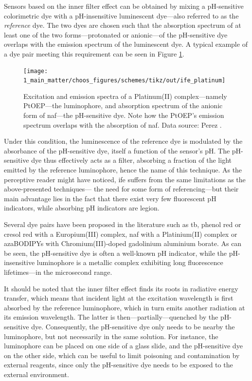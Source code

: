 Sensors based on the inner filter effect can be obtained by mixing a pH-sensitive colorimetric dye with a pH-insensitive luminescent dye---also referred to as the \emph{reference} dye. The two dyes are chosen such that the absorption spectrum of at least one of the two forms---protonated or anionic---of the pH-sensitive dye overlaps with the emission spectrum of the luminescent dye. A typical example of a dye pair meeting this requirement can be seen in Figure \ref{fig:choos:dye_based:advanced:ife_ex}.

\begin{figure}
	\centering
	\texttt{[image: 1\_main\_matter/choos\_figures/schemes/tikz/out/ife\_platinum]}
	\caption[\gls{ife} scheme example.]{Excitation and emission spectra of a Platinum(II) complex---namely PtOEP---the luminophore, and absorption spectrum of the anionic form of \gls{naf}---the pH-sensitive dye. Note how the PtOEP's emission spectrum overlaps with the absorption of \gls{naf}. Data source: Perez \etal{}\cite{perez2009}.}
	\label{fig:choos:dye_based:advanced:ife_ex}
\end{figure}

Under this condition, the luminescence of the reference dye is modulated by the absorbance of the pH-sensitive dye, itself a function of the sensor's pH. The pH-sensitive dye thus effectively acts as a filter, absorbing a fraction of the light emitted by the reference luminophore, hence the name of this technique. As the perceptive reader might have noticed, \gls{ife} suffers from the same limitations as the above-presented techniques---\ie{} the need for some form of referencing\cite{amao2004}---but their main advantage lies in the fact that there exist very few fluorescent pH indicators, while absorbing pH indicators are legion\cite{nakamura2003}.

Several dye pairs have been proposed in the literature such as \gls{tb}, phenol red or cresol red with a Europium(III) complex\cite{nakamura2003}, \gls{naf} with a Platinium(II) complex\cite{perez2009, aguayolopez2014, fernandezramos2018} or azaBODIPYs with Chromium(III)-doped gadolinium aluminium borate. As can be seen, the pH-sensitive dye is often a well-known pH indicator, while the pH-insensitive luminophore is a metallic complex exhibiting long fluorescence lifetimes---in the microsecond range.

It should be noted that the inner filter effect finds its roots in radiative energy transfer, which means that incident light at the excitation wavelength is first absorbed by the reference luminophore, which in turn emits another radiation at its emission wavelength. The latter is then---partially---quenched by the pH-sensitive dye. Consequently, the pH-sensitive dye only needs to be nearby the luminophore, but not necessarily in the same solution. For instance, the luminophore can be placed on one side of a glass slide, and the pH-sensitive dye on the other side\cite{nakamura2003, amao2004, amao2005a}, which can be useful to limit poisoning and contamination by external reagents, since only the pH-sensitive dye needs to be exposed to the external environment.

